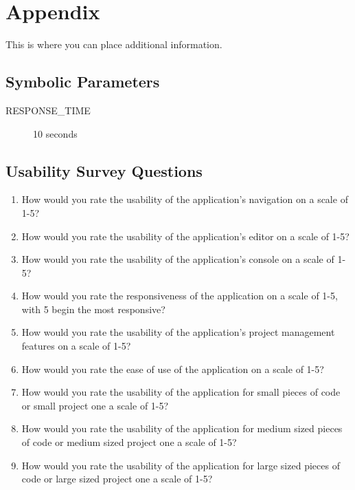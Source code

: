 \documentclass[12pt, titlepage]{article}
\begin{document}
\newpage

\section{Appendix}

This is where you can place additional information.

\subsection{Symbolic Parameters}

\begin{description}
\item [RESPONSE\_TIME] 10 seconds

\end{description}

\subsection{Usability Survey Questions}
\begin{enumerate}
  \item How would you rate the usability of the application's navigation on a
    scale of 1-5?
  \item How would you rate the usability of the application's editor on a scale
    of 1-5?
  \item How would you rate the usability of the application's console on a
    scale of 1-5?
  \item How would you rate the responsiveness of the application on a scale of
    1-5, with 5 begin the most responsive?
  \item How would you rate the usability of the application's project
    management features on a scale of 1-5?
  \item How would you rate the ease of use of the application on a scale of
    1-5?
  \item How would you rate the usability of the application for small pieces of
    code or small project one a scale of 1-5?
  \item How would you rate the usability of the application for medium sized
    pieces of code or medium sized project one a scale of 1-5?
  \item How would you rate the usability of the application for large sized
    pieces of code or large sized project one a scale of 1-5?
\end{enumerate}
\end{document}
